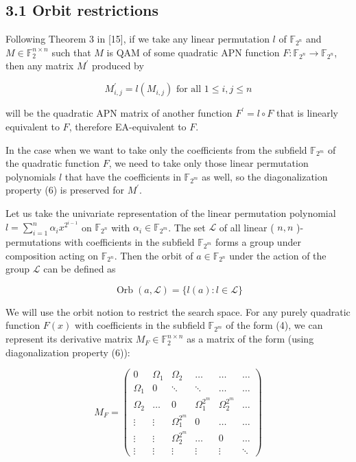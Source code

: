 \documentclass[10pt]{article}
\begin{document}
\subsection*{3.1 Orbit restrictions}
Following Theorem 3 in [15], if we take any linear permutation $l$ of $\mathbb{F}_{2^{n}}$ and $M \in \mathbb{F}_{2}^{n \times n}$ such that $M$ is QAM of some quadratic APN function $F: \mathbb{F}_{2^{n}} \rightarrow \mathbb{F}_{2^{n}}$, then any matrix $M^{\prime}$ produced by


\begin{equation*}
M_{i, j}^{\prime}=l\left(M_{i, j}\right) \text { for all } 1 \leq i, j \leq n \tag{7}
\end{equation*}


will be the quadratic APN matrix of another function $F^{\prime}=l \circ F$ that is linearly equivalent to $F$, therefore EA-equivalent to $F$.

In the case when we want to take only the coefficients from the subfield $\mathbb{F}_{2^{m}}$ of the quadratic function $F$, we need to take only those linear permutation polynomials $l$ that have the coefficients in $\mathbb{F}_{2^{m}}$ as well, so the diagonalization property (6) is preserved for $M^{\prime}$.

Let us take the univariate representation of the linear permutation polynomial $l=\sum_{i=1}^{n} \alpha_{i} x^{2^{i-1}}$ on $\mathbb{F}_{2^{n}}$ with $\alpha_{i} \in \mathbb{F}_{2^{m}}$. The set $\mathcal{L}$ of all linear ( $n, n$ )-permutations with coefficients in the subfield $\mathbb{F}_{2^{m}}$ forms a group under composition acting on $\mathbb{F}_{2^{n}}$. Then the orbit of $a \in \mathbb{F}_{2^{n}}$ under the action of the group $\mathcal{L}$ can be defined as

$$
\operatorname{Orb}(a, \mathcal{L})=\{l(a): l \in \mathcal{L}\}
$$

We will use the orbit notion to restrict the search space. For any purely quadratic function $F(x)$ with coefficients in the subfield $\mathbb{F}_{2^{m}}$ of the form (4), we can represent its derivative matrix $M_{F} \in \mathbb{F}_{2}^{n \times n}$ as a matrix of the form (using diagonalization property (6)):

\[
M_{F}=\left(\begin{array}{cccccc}
0 & \Omega_{1} & \Omega_{2} & \ldots & \ldots & \ldots  \tag{8}\\
\Omega_{1} & 0 & \ddots & \ddots & \ldots & \ldots \\
\Omega_{2} & \ldots & 0 & \Omega_{1}^{2^{m}} & \Omega_{2}^{2^{m}} & \ldots \\
\vdots & \vdots & \Omega_{1}^{2^{m}} & 0 & \ldots & \ldots \\
\vdots & \vdots & \Omega_{2}^{2^{m}} & \ldots & 0 & \ldots \\
\vdots & \vdots & \vdots & \vdots & \vdots & \ddots
\end{array}\right)
\]
\end{document}
